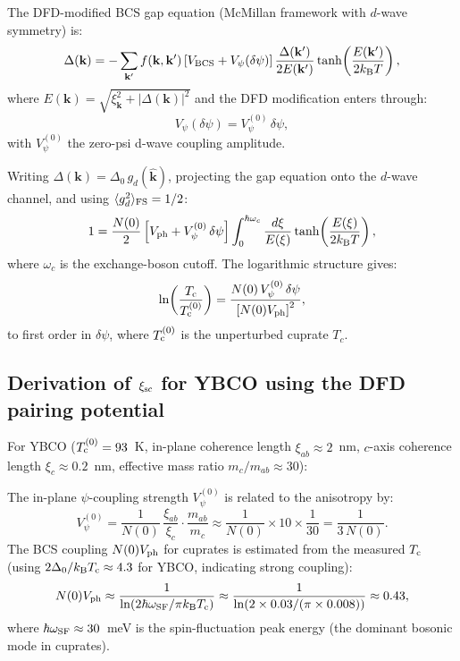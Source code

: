 \documentclass[11pt]{article}
\newcommand{\kB}{k_{\rm B}}
\newcommand{\Tc}{T_{\rm c}}
\begin{document}
The DFD-modified BCS gap equation (McMillan framework with
$d$-wave symmetry) is:
\begin{equation}
\Delta(\mathbf{k}) = -\sum_{\mathbf{k}'} f(\mathbf{k},\mathbf{k}')
  \left[V_{\rm BCS} + V_\psi(\delta\psi)\right]
  \frac{\Delta(\mathbf{k}')}{2E(\mathbf{k}')}\tanh\!\left(\frac{E(\mathbf{k}')}{2\kB T}\right),
\label{eq:gap-eq}
\end{equation}
where $E(\mathbf{k}) = \sqrt{\xi_\mathbf{k}^2 + |\Delta(\mathbf{k})|^2}$
and the DFD modification enters through:
\begin{equation}
V_\psi(\delta\psi) = V_\psi^{(0)}\,\delta\psi,
\label{eq:Vpsi-delta}
\end{equation}
with $V_\psi^{(0)}$ the zero-psi d-wave coupling amplitude.

Writing $\Delta(\mathbf{k}) = \Delta_0\,g_d(\hat{\mathbf{k}})$,
projecting the gap equation onto the $d$-wave channel, and using
$\langle g_d^2 \rangle_{\rm FS} = 1/2$:
\begin{equation}
1 = \frac{N(0)}{2}\left[V_{\rm ph} + V_\psi^{(0)}\,\delta\psi\right]
  \int_0^{\hbar\omega_c}\frac{d\xi}{E(\xi)}
  \tanh\!\left(\frac{E(\xi)}{2\kB T}\right),
\label{eq:gap-projected}
\end{equation}
where $\omega_c$ is the exchange-boson cutoff. The logarithmic structure
gives:
\begin{equation}
\ln\!\left(\frac{\Tc}{\Tc^{(0)}}\right)
= \frac{N(0)\,V_\psi^{(0)}\,\delta\psi}
  {\left[N(0)V_{\rm ph}\right]^2},
\label{eq:Tc-ratio}
\end{equation}
to first order in $\delta\psi$, where $\Tc^{(0)}$ is the unperturbed
cuprate $T_c$.

\subsection{Derivation of $\xi_{\rm sc}$ for YBCO using the DFD
pairing potential}

For YBCO ($\Tc^{(0)} = 93$~K, in-plane coherence length
$\xi_{ab} \approx 2$~nm, $c$-axis coherence length $\xi_c \approx
0.2$~nm, effective mass ratio $m_c/m_{ab} \approx 30$):

The in-plane $\psi$-coupling strength $V_\psi^{(0)}$ is related to the
anisotropy by:
\begin{equation}
V_\psi^{(0)} = \frac{1}{N(0)}\,\frac{\xi_{ab}}{\xi_c}
  \cdot \frac{m_{ab}}{m_c}
  \approx \frac{1}{N(0)} \times 10 \times \frac{1}{30}
  = \frac{1}{3\,N(0)}.
\label{eq:Vpsi-YBCO}
\end{equation}
The BCS coupling $N(0)V_{\rm ph}$ for cuprates is estimated from the
measured $\Tc$ (using $2\Delta_0/\kB\Tc \approx 4.3$ for YBCO,
indicating strong coupling):
\begin{equation}
N(0)V_{\rm ph} \approx \frac{1}{\ln(2\hbar\omega_{\rm SF}/\pi\kB\Tc)}
\approx \frac{1}{\ln(2 \times 0.03 / (\pi \times 0.008))}
\approx 0.43,
\label{eq:NVph-YBCO}
\end{equation}
where $\hbar\omega_{\rm SF} \approx 30$~meV is the spin-fluctuation
peak energy (the dominant bosonic mode in cuprates).
\end{document}
